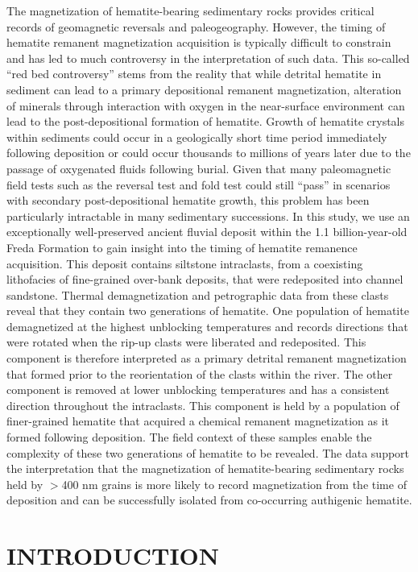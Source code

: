 \documentclass[11pt,letterpaper]{article}
\begin{document}
The magnetization of hematite-bearing sedimentary rocks provides critical records of geomagnetic reversals and paleogeography. However, the timing of hematite remanent magnetization acquisition is typically difficult to constrain and has led to much controversy in the interpretation of such data. This so-called ``red bed controversy'' stems from the reality that while detrital hematite in sediment can lead to a primary depositional remanent magnetization, alteration of minerals through interaction with oxygen in the near-surface environment can lead to the post-depositional formation of hematite. Growth of hematite crystals within sediments could occur in a geologically short time period immediately following deposition or could occur thousands to millions of years later due to the passage of oxygenated fluids following burial. Given that many paleomagnetic field tests such as the reversal test and fold test could still ``pass'' in scenarios with secondary post-depositional hematite growth, this problem has been particularly intractable in many sedimentary successions. In this study, we use an exceptionally well-preserved ancient fluvial deposit within the 1.1 billion-year-old Freda Formation to gain insight into the timing of hematite remanence acquisition. This deposit contains siltstone intraclasts, from a coexisting lithofacies of fine-grained over-bank deposits, that were redeposited into channel sandstone. Thermal demagnetization and petrographic data from these clasts reveal that they contain two generations of hematite. One population of hematite demagnetized at the highest unblocking temperatures and records directions that were rotated when the rip-up clasts were liberated and redeposited. This component is therefore interpreted as a primary detrital remanent magnetization that formed prior to the reorientation of the clasts within the river. The other component is removed at lower unblocking temperatures and has a consistent direction throughout the intraclasts. This component is held by a population of finer-grained hematite that acquired a chemical remanent magnetization as it formed following deposition. The field context of these samples enable the complexity of these two generations of hematite to be revealed. The data support the interpretation that the magnetization of hematite-bearing sedimentary rocks held by $>$400 nm grains is more likely to record magnetization from the time of deposition and can be successfully isolated from co-occurring authigenic hematite.

\section*{INTRODUCTION}
\end{document}
